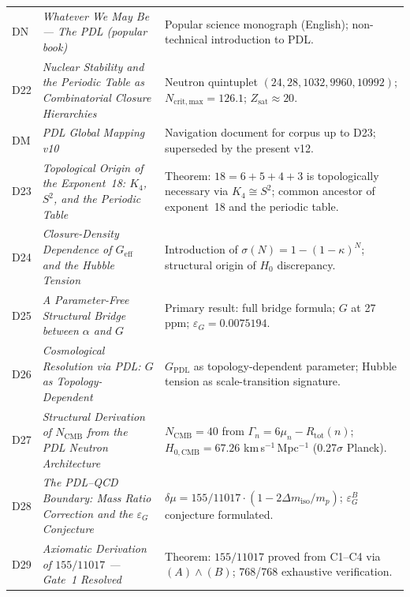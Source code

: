 \documentclass[11pt,a4paper]{article}
\theoremstyle{plain}
\theoremstyle{definition}
\theoremstyle{remark}
\newcommand{\Kfour}{K_4}
\newcommand{\Geff}{G_{\mathrm{eff}}}
\newcommand{\GPDL}{G_{\mathrm{PDL}}}
\newcommand{\epsG}{\varepsilon_G}
\newcommand{\Rtot}{R_{\mathrm{tot}}}
\newcommand{\sigmaN}{\sigma(N)}
\begin{document}
\begin{longtable}{@{}L{1.3cm}L{3.8cm}L{8.0cm}@{}}
DN & \textit{Whatever We May Be — The PDL (popular book)}~\citep{DN} & Popular science monograph (English); non-technical introduction to PDL. \\[0.3em]

D22 & \textit{Nuclear Stability and the Periodic Table as Combinatorial Closure Hierarchies}~\citep{D22} & Neutron quintuplet $(24,28,1032,9960,10992)$; $N_{\mathrm{crit,max}}=126.1$; $Z_{\mathrm{sat}}\approx 20$. \\[0.3em]

DM & \textit{PDL Global Mapping v10}~\citep{D_Map_v10} & Navigation document for corpus up to D23; superseded by the present v12. \\[0.3em]

D23 & \textit{Topological Origin of the Exponent~18: $\Kfour$, $S^2$, and the Periodic Table}~\citep{D23} & \textcolor{proofblue}{Theorem}: $18=6+5+4+3$ is topologically necessary via $\Kfour\cong S^2$; common ancestor of exponent~18 and the periodic table. \\[0.3em]

D24 & \textit{Closure-Density Dependence of $\Geff$ and the Hubble Tension}~\citep{D24} & Introduction of $\sigmaN=1-(1-\kappa)^N$; structural origin of $H_0$ discrepancy. \\[0.3em]

D25 & \textit{A Parameter-Free Structural Bridge between $\alpha$ and $G$}~\citep{D25} & \textcolor{proofblue}{Primary result}: full bridge formula; $G$ at 27 ppm; $\epsG=0.0075194$. \\[0.3em]

D26 & \textit{Cosmological Resolution via PDL: $G$ as Topology-Dependent}~\citep{D26} & $\GPDL$ as topology-dependent parameter; Hubble tension as scale-transition signature. \\[0.3em]

D27 & \textit{Structural Derivation of $N_{\mathrm{CMB}}$ from the PDL Neutron Architecture}~\citep{D27} & $N_{\mathrm{CMB}}=40$ from $\Gamma_n=6\mu_n-\Rtot(n)$; $H_{0,\mathrm{CMB}}=67.26$ km\,s$^{-1}$\,Mpc$^{-1}$ (0.27$\sigma$ Planck). \\[0.3em]

D28 & \textit{The PDL--QCD Boundary: Mass Ratio Correction and the $\epsG$ Conjecture}~\citep{D28} & $\delta\mu=155/11017\cdot(1-2\Delta m_{\mathrm{iso}}/m_p)$; $\epsG^B$ conjecture formulated. \\[0.3em]

D29 & \textit{Axiomatic Derivation of $155/11017$ — Gate~1 Resolved}~\citep{D29} & \textcolor{proofblue}{Theorem}: $155/11017$ proved from C1--C4 via $(A)\wedge(B)$; 768/768 exhaustive verification. \\[0.3em]


\end{longtable}
\end{document}
